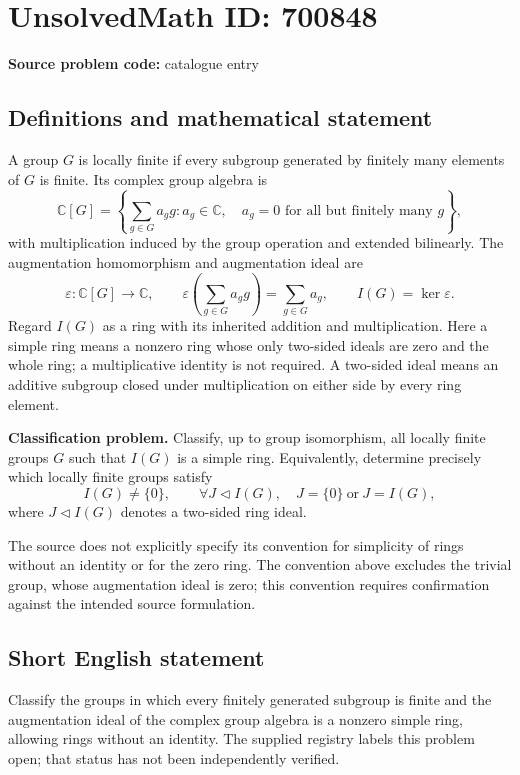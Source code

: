 \documentclass[11pt]{article}
\newcommand{\C}{\mathbb{C}}
\begin{document}
\section*{UnsolvedMath ID: 700848}
\textbf{Source problem code:} catalogue entry
\subsection{Definitions and mathematical statement}
A group \(G\) is locally finite if every subgroup generated by finitely many elements of \(G\) is finite. Its complex group algebra is
\[
\C[G]=\left\{\sum_{g\in G}a_g g : a_g\in\C,\quad a_g=0\text{ for all but finitely many }g\right\},
\]
with multiplication induced by the group operation and extended bilinearly. The augmentation homomorphism and augmentation ideal are
\[
\varepsilon:\C[G]\longrightarrow\C,\qquad
\varepsilon\left(\sum_{g\in G}a_g g\right)=\sum_{g\in G}a_g,
\qquad I(G)=\ker\varepsilon.
\]
Regard \(I(G)\) as a ring with its inherited addition and multiplication. Here a simple ring means a nonzero ring whose only two-sided ideals are zero and the whole ring; a multiplicative identity is not required. A two-sided ideal means an additive subgroup closed under multiplication on either side by every ring element.

\textbf{Classification problem.} Classify, up to group isomorphism, all locally finite groups \(G\) such that \(I(G)\) is a simple ring. Equivalently, determine precisely which locally finite groups satisfy
\[
I(G)\ne\{0\},\qquad
\forall J\triangleleft I(G),\quad J=\{0\}\ \text{or}\ J=I(G),
\]
where \(J\triangleleft I(G)\) denotes a two-sided ring ideal.

The source does not explicitly specify its convention for simplicity of rings without an identity or for the zero ring. The convention above excludes the trivial group, whose augmentation ideal is zero; this convention requires confirmation against the intended source formulation.
\subsection{Short English statement}
Classify the groups in which every finitely generated subgroup is finite and the augmentation ideal of the complex group algebra is a nonzero simple ring, allowing rings without an identity. The supplied registry labels this problem open; that status has not been independently verified.
\end{document}
